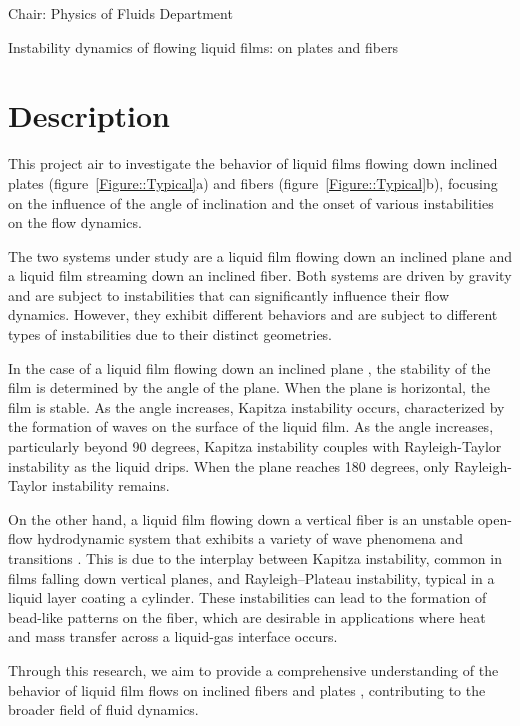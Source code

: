\documentclass[a4paper,10pt]{article}
\begin{document}
\noindent Chair: Physics of Fluids Department
\begin{center}
 \begin{LARGE}
  Instability dynamics of flowing liquid films: on plates and fibers
 \end{LARGE}
\end{center}

\section*{Description}

This project air to investigate the behavior of liquid films flowing down inclined plates (figure~\ref{Figure::Typical}a) and fibers  (figure~\ref{Figure::Typical}b), focusing on the influence of the angle of inclination and the onset of various instabilities on the flow dynamics.

The two systems under study are a liquid film flowing down an inclined plane and a liquid film streaming down an inclined fiber. Both systems are driven by gravity and are subject to instabilities that can significantly influence their flow dynamics. However, they exhibit different behaviors and are subject to different types of instabilities due to their distinct geometries.

In the case of a liquid film flowing down an inclined plane \citep{craster2009dynamics}, the stability of the film is determined by the angle of the plane. When the plane is horizontal, the film is stable. As the angle increases, Kapitza instability occurs, characterized by the formation of waves on the surface of the liquid film. As the angle increases, particularly beyond 90 degrees, Kapitza instability couples with Rayleigh-Taylor instability as the liquid drips. When the plane reaches 180 degrees, only Rayleigh-Taylor instability remains.

On the other hand, a liquid film flowing down a vertical fiber is an unstable open-flow hydrodynamic system that exhibits a variety of wave phenomena and transitions \citep{kalliadasis1994drop, quere1999fluid, kliakhandler2001viscous, craster2006viscous}. This is due to the interplay between Kapitza instability, common in films falling down vertical planes, and Rayleigh–Plateau instability, typical in a liquid layer coating a cylinder. These instabilities can lead to the formation of bead-like patterns on the fiber, which are desirable in applications where heat and mass transfer across a liquid-gas interface occurs.

Through this research, we aim to provide a comprehensive understanding of the behavior of liquid film flows on inclined fibers \citep{pour2023experimental} and plates \citep{craster2009dynamics}, contributing to the broader field of fluid dynamics.
\end{document}

